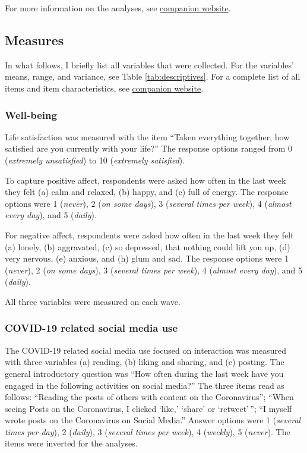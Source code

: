 \documentclass[
  english,
  man,mask,floatsintext]{apa6}
\begin{document}
For more information on the analyses, see \href{https://xmtra.github.io/Austrian_Corona_Panel_Project/index.html}{companion website}.

\hypertarget{measures}{%
\subsection{Measures}\label{measures}}

In what follows, I briefly list all variables that were collected.
For the variables' means, range, and variance, see Table \ref{tab:descriptives}.
For a complete list of all items and item characteristics, see \href{https://xmtra.github.io/Austrian_Corona_Panel_Project/index.html}{companion website}.

\hypertarget{well-being}{%
\subsubsection{Well-being}\label{well-being}}

Life satisfaction was measured with the item ``Taken everything together, how satisfied are you currently with your life?''
The response options ranged from 0 (\emph{extremely unsatisfied}) to 10 (\emph{extremely satisfied}).

To capture positive affect, respondents were asked how often in the last week they felt (a) calm and relaxed, (b) happy, and (c) full of energy.
The response options were 1 (\emph{never}), 2 (\emph{on some days}), 3 (\emph{several times per week}), 4 (\emph{almost every day}), and 5 (\emph{daily}).

For negative affect, respondents were asked how often in the last week they felt (a) lonely, (b) aggravated, (c) so depressed, that nothing could lift you up, (d) very nervous, (e) anxious, and (h) glum and sad.
The response options were 1 (\emph{never}), 2 (\emph{on some days}), 3 (\emph{several times per week}), 4 (\emph{almost every day}), and 5 (\emph{daily}).

All three variables were measured on each wave.

\hypertarget{covid-19-related-social-media-use}{%
\subsubsection{COVID-19 related social media use}\label{covid-19-related-social-media-use}}

The COVID-19 related social media use focused on interaction was measured with three variables (a) reading, (b) liking and sharing, and (c) posting.
The general introductory question was ``How often during the last week have you engaged in the following activities on social media?''
The three items read as follows:
``Reading the posts of others with content on the Coronavirus''; ``When seeing Posts on the Coronavirus, I clicked `like,' `share' or `retweet'\,''; ``I myself wrote posts on the Coronavirus on Social Media.''
Answer options were 1 (\emph{several times per day}), 2 (\emph{daily}), 3 (\emph{several times per week}), 4 (\emph{weekly}), 5 (\emph{never}).
The items were inverted for the analyses.
\end{document}
